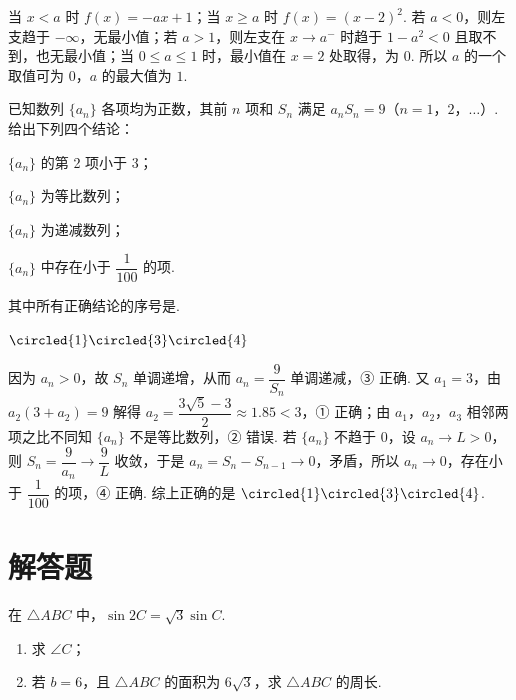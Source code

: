\begin{solution}
当 \(x<a\) 时 \(f(x)=-ax+1\)；当 \(x\ge a\) 时 \(f(x)=(x-2)^2\). 若 \(a<0\)，则左支趋于 \(-\infty\)，无最小值；若 \(a>1\)，则左支在 \(x\to a^-\) 时趋于 \(1-a^2<0\) 且取不到，也无最小值；当 \(0\le a\le1\) 时，最小值在 \(x=2\) 处取得，为 \(0\). 所以 \(a\) 的一个取值可为 \(0\)，\(a\) 的最大值为 \(1\).
\end{solution}

\begin{problem}
已知数列 \(\{a_n\}\) 各项均为正数，其前 \(n\) 项和 \(S_n\) 满足 \(a_nS_n=9\)（\(n=1\)，\(2\)，\(\dots\)）. 给出下列四个结论：

\begin{circlelist}
\item \(\{a_n\}\) 的第 2 项小于 3；

\item \(\{a_n\}\) 为等比数列；

\item \(\{a_n\}\) 为递减数列；

\item \(\{a_n\}\) 中存在小于 \(\dfrac{1}{100}\) 的项.
\end{circlelist}

其中所有正确结论的序号是\fillinblank{}.
\end{problem}

\begin{answer}
\(\circled{1}\circled{3}\circled{4}\)
\end{answer}

\begin{solution}
因为 \(a_n>0\)，故 \(S_n\) 单调递增，从而 \(a_n=\dfrac9{S_n}\) 单调递减，③ 正确. 又 \(a_1=3\)，由 \(a_2(3+a_2)=9\) 解得 \(a_2=\dfrac{3\sqrt5-3}{2}\approx1.85<3\)，① 正确；由 \(a_1\)，\(a_2\)，\(a_3\) 相邻两项之比不同知 \(\{a_n\}\) 不是等比数列，② 错误. 若 \(\{a_n\}\) 不趋于 \(0\)，设 \(a_n\to L>0\)，则 \(S_n=\dfrac9{a_n}\to\dfrac9L\) 收敛，于是 \(a_n=S_n-S_{n-1}\to0\)，矛盾，所以 \(a_n\to0\)，存在小于 \(\dfrac1{100}\) 的项，④ 正确. 综上正确的是 \(\circled{1}\circled{3}\circled{4}\).
\end{solution}

\section{解答题}

\begin{problem}
在 \(\triangle ABC\) 中，\(\sin 2C=\sqrt3\sin C\).

\begin{enumerate}
\item 求 \(\angle C\)；

\item 若 \(b=6\)，且 \(\triangle ABC\) 的面积为 \(6\sqrt3\)，求 \(\triangle ABC\) 的周长.
\end{enumerate}
\end{problem}


